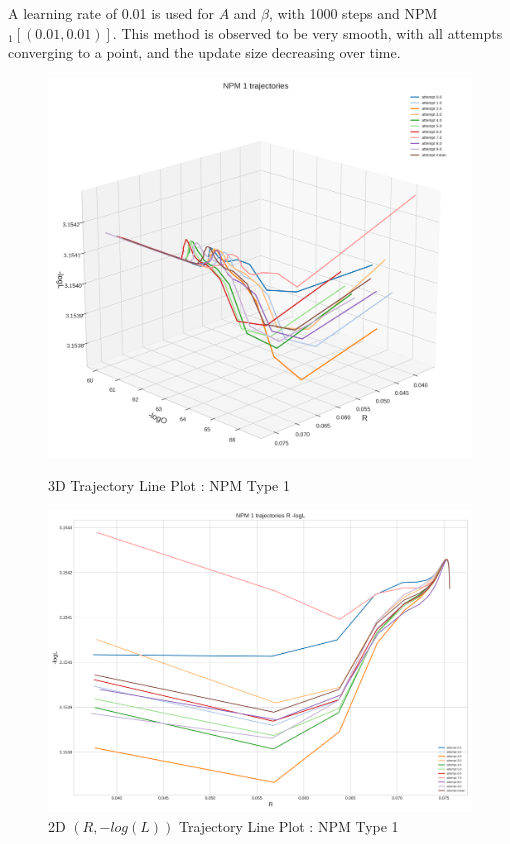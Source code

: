 A learning rate of 0.01 is used for $A$ and $\beta$, with 1000 steps and NPM$_1[(0.01,0.01)]$. This method is observed to be very smooth, with all attempts converging to a point, and the update size decreasing over time.
\begin{figure}[H]
    \centering
    \begin{minipage}[t]{0.45\textwidth}
        \centering
        \includegraphics[width=\textwidth]{images/1-NPM 1 mean trajectory.png}
        \captionsetup{font=tiny}
        \caption{3D Trajectory Line Plot : NPM Type 1}
        \label{fig:cumulative_returns}
    \end{minipage}%
    \begin{minipage}[t]{0.5511\textwidth}
        \centering
        \includegraphics[width=\textwidth]{images/NPM 1 trajectories R -logL.png}
        \captionsetup{font=tiny}
        \caption{2D $(R,-log(L))$ Trajectory Line Plot : NPM Type 1}
        \label{fig:corr_matrix_ts_qrt_data}
    \end{minipage}
\end{figure} 
